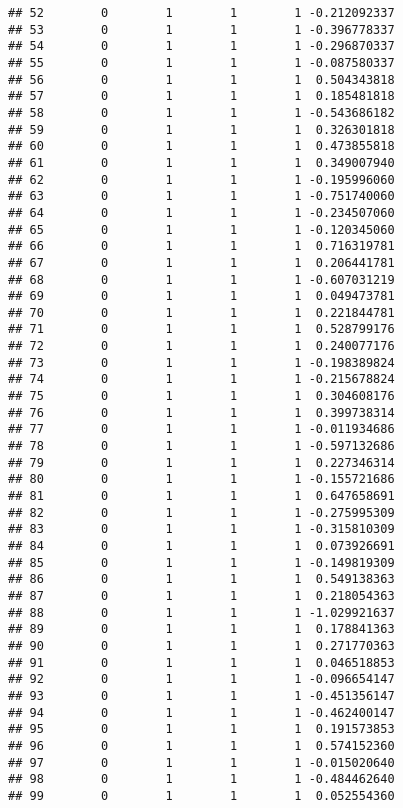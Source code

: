 \documentclass[]{book}
\theoremstyle{definition}
\theoremstyle{definition}
\theoremstyle{definition}
\theoremstyle{remark}
\begin{document}
\begin{verbatim}
## 52        0        1        1        1 -0.212092337
## 53        0        1        1        1 -0.396778337
## 54        0        1        1        1 -0.296870337
## 55        0        1        1        1 -0.087580337
## 56        0        1        1        1  0.504343818
## 57        0        1        1        1  0.185481818
## 58        0        1        1        1 -0.543686182
## 59        0        1        1        1  0.326301818
## 60        0        1        1        1  0.473855818
## 61        0        1        1        1  0.349007940
## 62        0        1        1        1 -0.195996060
## 63        0        1        1        1 -0.751740060
## 64        0        1        1        1 -0.234507060
## 65        0        1        1        1 -0.120345060
## 66        0        1        1        1  0.716319781
## 67        0        1        1        1  0.206441781
## 68        0        1        1        1 -0.607031219
## 69        0        1        1        1  0.049473781
## 70        0        1        1        1  0.221844781
## 71        0        1        1        1  0.528799176
## 72        0        1        1        1  0.240077176
## 73        0        1        1        1 -0.198389824
## 74        0        1        1        1 -0.215678824
## 75        0        1        1        1  0.304608176
## 76        0        1        1        1  0.399738314
## 77        0        1        1        1 -0.011934686
## 78        0        1        1        1 -0.597132686
## 79        0        1        1        1  0.227346314
## 80        0        1        1        1 -0.155721686
## 81        0        1        1        1  0.647658691
## 82        0        1        1        1 -0.275995309
## 83        0        1        1        1 -0.315810309
## 84        0        1        1        1  0.073926691
## 85        0        1        1        1 -0.149819309
## 86        0        1        1        1  0.549138363
## 87        0        1        1        1  0.218054363
## 88        0        1        1        1 -1.029921637
## 89        0        1        1        1  0.178841363
## 90        0        1        1        1  0.271770363
## 91        0        1        1        1  0.046518853
## 92        0        1        1        1 -0.096654147
## 93        0        1        1        1 -0.451356147
## 94        0        1        1        1 -0.462400147
## 95        0        1        1        1  0.191573853
## 96        0        1        1        1  0.574152360
## 97        0        1        1        1 -0.015020640
## 98        0        1        1        1 -0.484462640
## 99        0        1        1        1  0.052554360

\end{verbatim}
\end{document}
